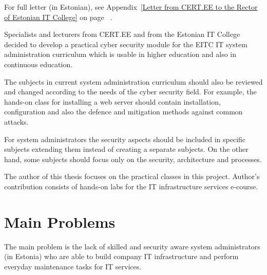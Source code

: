 For full letter (in Estonian), see Appendix~\ref{Letter from CERT.EE to the Rector of Estonian IT College} on page ~\pageref{Letter from CERT.EE to the Rector of Estonian IT College}.

Specialists and lecturers from \gls{CERT.EE} and from the Estonian IT College decided to develop a practical cyber security module for the \gls{EITC} IT system administration curriculum which is usable in higher education and also in continuous education.

The subjects in current system administration curriculum should also be reviewed and changed according to the needs of the cyber security field. For example, the hands-on class for installing a web server should contain installation, configuration and also the defence and mitigation methods against common attacks. 

For system administrators the security aspects should be included in specific subjects extending them instead of creating a separate subjects. On the other hand, some subjects should focus only on the security, architecture and processes.

The author of this thesis focuses on the practical classes in this project. Author's contribution consists of hands-on labs for the IT infrastructure services e-course.

\section{Main Problems}
The main problem is the lack of skilled and security aware system administrators (in Estonia) who are able to build company IT infrastructure and perform everyday maintenance tasks for IT services.

